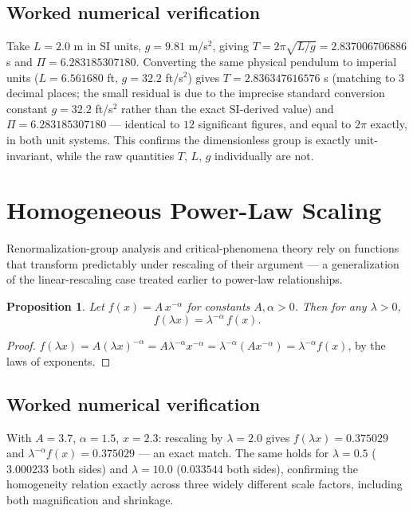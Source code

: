 \documentclass[10pt,journal,compsoc]{IEEEtran}
\newtheorem{proposition}{Proposition}
\begin{document}
\subsection{Worked numerical verification}
Take $L=2.0$ m in SI units, $g=9.81$ m/s$^2$, giving $T = 2\pi\sqrt{L/g} = 2.837006706886$ s and $\Pi = 6.283185307180$. Converting the same physical pendulum to imperial units ($L=6.561680$ ft, $g=32.2$ ft/s$^2$) gives $T=2.836347616576$ s (matching to 3 decimal places; the small residual is due to the imprecise standard conversion constant $g=32.2$ ft/s$^2$ rather than the exact SI-derived value) and $\Pi = 6.283185307180$ — identical to $12$ significant figures, and equal to $2\pi$ exactly, in both unit systems. This confirms the dimensionless group is exactly unit-invariant, while the raw quantities $T$, $L$, $g$ individually are not.

\section{Homogeneous Power-Law Scaling}
Renormalization-group analysis and critical-phenomena theory rely on functions that transform predictably under rescaling of their argument — a generalization of the linear-rescaling case treated earlier to power-law relationships.

\begin{proposition}
Let $f(x) = A\,x^{-\alpha}$ for constants $A,\alpha>0$. Then for any $\lambda>0$,
\begin{equation}
    f(\lambda x) = \lambda^{-\alpha}\, f(x).
\end{equation}
\end{proposition}
\begin{proof}
$f(\lambda x) = A(\lambda x)^{-\alpha} = A\lambda^{-\alpha}x^{-\alpha} = \lambda^{-\alpha}\left(Ax^{-\alpha}\right) = \lambda^{-\alpha}f(x)$, by the laws of exponents.
\end{proof}

\subsection{Worked numerical verification}
With $A=3.7$, $\alpha=1.5$, $x=2.3$: rescaling by $\lambda=2.0$ gives $f(\lambda x)=0.375029$ and $\lambda^{-\alpha}f(x)=0.375029$ — an exact match. The same holds for $\lambda=0.5$ ($3.000233$ both sides) and $\lambda=10.0$ ($0.033544$ both sides), confirming the homogeneity relation exactly across three widely different scale factors, including both magnification and shrinkage.
\end{document}

